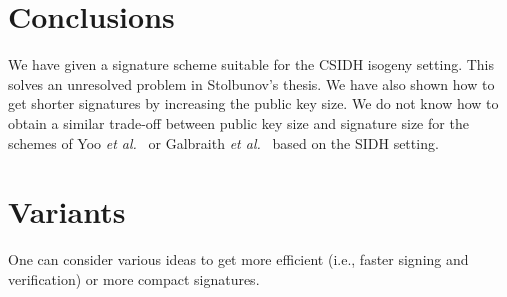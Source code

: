\documentclass{llncs}
\begin{document}
\section{Conclusions}


We have given a signature scheme suitable for the CSIDH isogeny setting.
This solves an unresolved problem in Stolbunov's thesis.
We have also shown how to get shorter signatures by increasing the public key size.
We do not know how to obtain a similar trade-off between public key size and signature size for the schemes of Yoo \emph{et al.}~\cite{YAJJS17} or Galbraith \emph{et al.}~\cite{GPS17} based on the SIDH setting.


%






\appendix


\section{Variants}\label{sec:variants}

One can consider various ideas to get more efficient (i.e., faster signing and verification) or more compact signatures.
\end{document}
